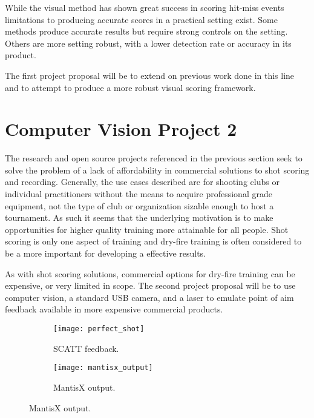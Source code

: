 \documentclass[conference]{IEEEtran}
\begin{document}
While the visual method has shown great success in scoring hit-miss events \cite{Ye2011}
limitations to producing accurate scores in a practical setting exist.
Some methods \cite{Rudzinski2012} produce accurate results 
but require strong controls on the setting.
Others \cite{Stenhager2021} are more setting robust, 
with a lower detection rate or accuracy in its product.

The first project proposal will be to extend on previous work done in this line and to  attempt to produce a more robust visual scoring framework.

\section{Computer Vision Project 2}

The research and open source projects referenced in the previous section seek to solve the problem of a lack of affordability in commercial solutions to shot scoring and recording.
Generally, the use cases described are for shooting clubs or individual practitioners without the means to acquire professional grade equipment, not the type of club or organization sizable enough to host a tournament.
As such it seems that the underlying motivation is to make opportunities for higher quality training more attainable for all people.
Shot scoring is only one aspect of training and dry-fire training is often \cite{Potter2017}
considered to be a more important for developing a effective results.

As with shot scoring solutions, commercial options for dry-fire training can be expensive, or very limited in scope.
The second project proposal will be to use computer vision, a standard USB camera, and a laser to emulate point of aim feedback available in more expensive 
\cite{scatt} commercial products.

\begin{figure}[h]
	\begin{subfigure}{.5\textwidth}
		\centering
		\texttt{[image: perfect\_shot]}
		\caption{SCATT \cite{scatt} feedback.}
	\end{subfigure}
	\begin{subfigure}{.5\textwidth}
		\centering
		\texttt{[image: mantisx\_output]}
		\caption{MantisX output.}
	\end{subfigure}
\end{figure}
\end{document}
